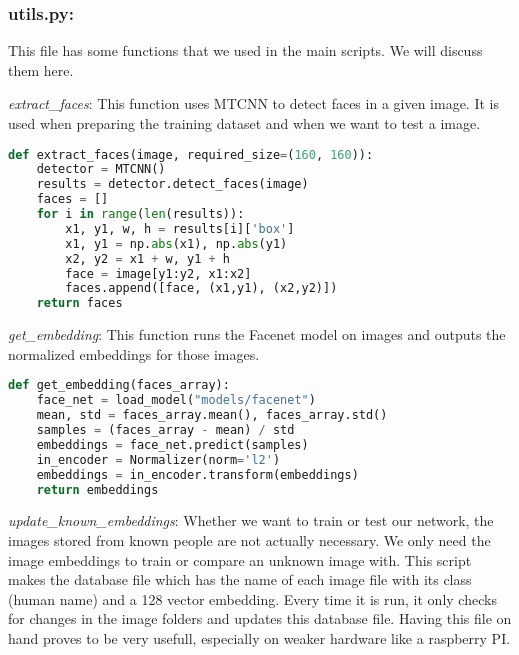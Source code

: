 \subsubsection*{utils.py:} This file has some functions that we used in the main scripts. We will discuss them here. 

\textit{extract\_faces}: This function uses MTCNN to detect faces in a given image. It is used when preparing the training dataset and when we want to test a image. 

\begin{center}{\begin{minipage}{0.9\linewidth}
\begin{lstlisting}[language=Python, basicstyle=\fontsize{10}{10}\selectfont\ttfamily]
def extract_faces(image, required_size=(160, 160)):
    detector = MTCNN()
    results = detector.detect_faces(image)
    faces = []
    for i in range(len(results)):
        x1, y1, w, h = results[i]['box']
        x1, y1 = np.abs(x1), np.abs(y1)
        x2, y2 = x1 + w, y1 + h
        face = image[y1:y2, x1:x2]
        faces.append([face, (x1,y1), (x2,y2)])
    return faces
\end{lstlisting}
\end{minipage}}\end{center}

\textit{get\_embedding}: This function runs the Facenet model on images and outputs the normalized embeddings for those images. 

\begin{center}{\begin{minipage}{0.9\linewidth}
\begin{lstlisting}[language=Python, basicstyle=\fontsize{10}{10}\selectfont\ttfamily]
def get_embedding(faces_array):
    face_net = load_model("models/facenet")
    mean, std = faces_array.mean(), faces_array.std()
    samples = (faces_array - mean) / std
    embeddings = face_net.predict(samples)
    in_encoder = Normalizer(norm='l2')
    embeddings = in_encoder.transform(embeddings)
    return embeddings
\end{lstlisting}
\end{minipage}}\end{center}

\textit{update\_known\_embeddings}: Whether we want to train or test our network, the images stored from known people are not actually necessary. We only need the image embeddings to train or compare an unknown image with. This script makes the database file which has the name of each image file with its class (human name) and a 128 vector embedding. Every time it is run, it only checks for changes in the image folders and updates this database file. Having this file on hand proves to be very usefull, especially on weaker hardware like a raspberry PI. 

